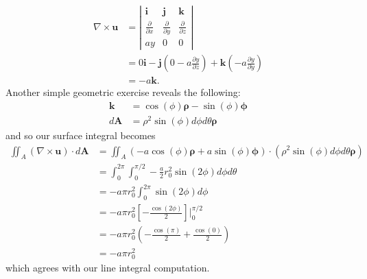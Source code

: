 \documentclass{article}
\begin{document}
\begin{itemize}
    \begin{align*}
        \nabla\times \mathbf{u} &= \left|\begin{matrix}
            \mathbf{i} & \mathbf{j} & \mathbf{k}\\
            \frac{\partial }{\partial x} & \frac{\partial}{\partial y} & \frac{\partial }{\partial z}\\
            ay & 0 & 0
        \end{matrix}\right|\\
        &= 0\mathbf{i} - \mathbf{j}\left(0 - a\frac{\partial y}{\partial z}\right) + \mathbf{k}\left(-a\frac{\partial y}{\partial y}\right)\\
        &= -a\mathbf{k}.
    \end{align*}
    Another simple geometric exercise reveals the following:
    \begin{align*}
        \mathbf{k} &= \cos(\phi)\bm{\rho} - \sin(\phi)\bm{\phi}\\
        d\mathbf{A} &= \rho^2\sin(\phi)d\phi d\theta \bm{\rho}
    \end{align*}
    and so our surface integral becomes
    \begin{align*}
        \iint_A(\nabla\times \mathbf{u})\cdot d\mathbf{A} &= \iint_A (-a\cos(\phi)\bm{\rho} + a\sin(\phi)\bm{\phi})\cdot (\rho^2\sin(\phi)d\phi d\theta \bm{\rho})\\
        &= \int_0^{2\pi}\int_0^{\pi/2}-\frac{a}{2}r_0^2\sin(2\phi)d\phi d\theta\\
        &= -a\pi r_0^2\int_0^{2\pi}\sin(2\phi)d\phi\\
        &= -a\pi r_0^2\left[-\frac{\cos(2\phi)}{2}\right]\bigg|_0^{\pi/2}\\
        &= -a\pi r_0^2\left(-\frac{\cos(\pi)}{2} + \frac{\cos(0)}{2}\right)\\
        &= -a\pi r_0^2 
    \end{align*}
    which agrees with our line integral computation.



\end{itemize}
\end{document}
